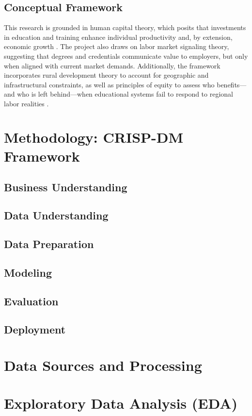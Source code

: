 \documentclass[runningheads]{llncs}
\begin{document}
\subsection{Conceptual Framework}
This research is grounded in human capital theory, which posits that investments in education and training enhance individual productivity and, by extension, economic growth \cite{usda2005}. The project also draws on labor market signaling theory, suggesting that degrees and credentials communicate value to employers, but only when aligned with current market demands. Additionally, the framework incorporates rural development theory to account for geographic and infrastructural constraints, as well as principles of equity to assess who benefits—and who is left behind—when educational systems fail to respond to regional labor realities \cite{ruralinnovation2023}.

\section{Methodology: CRISP-DM Framework}
\subsection{Business Understanding}
\subsection{Data Understanding}
\subsection{Data Preparation}
\subsection{Modeling}
\subsection{Evaluation}
\subsection{Deployment}

\section{Data Sources and Processing}

\section{Exploratory Data Analysis (EDA)}
\end{document}
